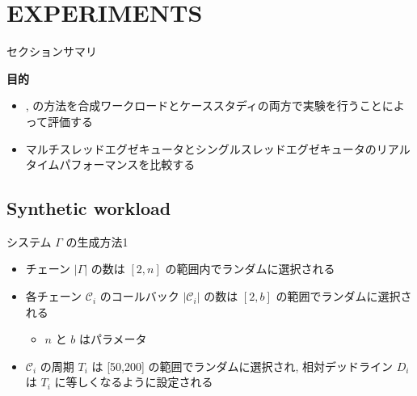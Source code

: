 
\section{EXPERIMENTS}
\label{sec: experiments}

\begin{frame}{セクションサマリ}
    \begin{itembox}[l]{\textbf{目的}}
        \begin{itemize}
            \item {},  の方法を合成ワークロードとケーススタディの両方で実験を行うことによって評価する
            \item マルチスレッドエグゼキュータとシングルスレッドエグゼキュータのリアルタイムパフォーマンスを比較する
        \end{itemize}
    \end{itembox}
\end{frame}

\subsection{Synthetic workload}
\label{ssec: synthetic workload}

\begin{frame}{システム $\Gamma$ の生成方法1}
    \begin{itemize}
        \item チェーン $|\Gamma|$ の数は $[2, n]$ の範囲内でランダムに選択される
        \item 各チェーン $\mathcal{C}_{i}$ のコールバック $\left|\mathcal{C}_{i}\right|$ の数は $[2, b]$ の範囲でランダムに選択される
              \begin{itemize}
                  \item $n$ と $b$ はパラメータ
              \end{itemize}
        \item $\mathcal{C}_{i}$ の周期 $T_{i}$ は [50,200] の範囲でランダムに選択され, 相対デッドライン $D_{i}$ は $T_{i}$ に等しくなるように設定される
    \end{itemize}
\end{frame}


